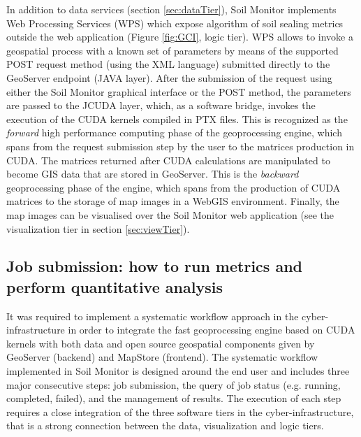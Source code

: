 \documentclass[APA,LATO1COL,doublespace]{WileyNJD-v2}
\begin{document}
In addition to data services (section \ref{sec:dataTier}), Soil Monitor implements Web Processing Services (WPS) which expose algorithm of soil sealing metrics outside the web application (Figure \ref{fig:GCI}, logic tier). 
WPS allows to invoke a geospatial process with a known set of parameters by means of the supported POST request method (using the XML language) submitted directly to the GeoServer endpoint (JAVA layer).
After the submission of the request using either the Soil Monitor graphical interface or the POST method, the parameters are passed to the JCUDA layer, which, as a software bridge, invokes the execution of the CUDA kernels compiled in PTX files.
This is recognized as the \textit{forward} high performance computing phase of the geoprocessing engine, which spans from the request submission step by the user to the matrices production in CUDA.
The matrices returned after CUDA calculations are manipulated to become GIS data that are stored in GeoServer.
This is the \textit{backward} geoprocessing phase of the engine, which spans from the production of CUDA matrices to the storage of map images in a WebGIS environment.
Finally, the map images can be visualised over the Soil Monitor web application (see the visualization tier in section \ref{sec:viewTier}).


\subsection{Job submission: how to run metrics and perform quantitative analysis}
\label{sec:jobsubmission}
It was required to implement a systematic workflow approach in the cyber-infrastructure in order to integrate the fast geoprocessing engine based on CUDA kernels with both data and open source geospatial components given by GeoServer (backend) and MapStore (frontend). 
The systematic workflow implemented in Soil Monitor is designed around the end user and includes three major consecutive steps: job submission, the query of job status (e.g. running, completed, failed), and the management of results.
The execution of each step requires a close integration of the three software tiers in the cyber-infrastructure, that is a strong connection between the data, visualization and logic tiers. 
\end{document}
